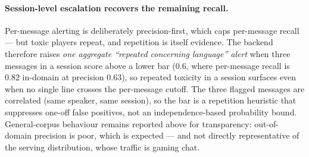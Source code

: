 \documentclass[11pt,a4paper]{article}
\begin{document}
\paragraph{Session-level escalation recovers the remaining recall.}
Per-message alerting is deliberately precision-first, which caps per-message recall
--- but toxic players repeat, and repetition is itself evidence. The backend
therefore raises \emph{one aggregate ``repeated concerning language'' alert} when
three messages in a session score above a lower bar ($0.6$, where per-message recall
is $0.82$ in-domain at precision $0.63$), so repeated toxicity in a session
surfaces even when no single line crosses the per-message cutoff. The three
flagged messages are correlated (same speaker, same session), so the bar is a
repetition heuristic that suppresses one-off false positives, not an
independence-based probability bound.
General-corpus behaviour remains reported above for transparency: out-of-domain precision
is poor, which is expected --- and not directly representative of the serving
distribution, whose traffic is gaming chat.
\end{document}
